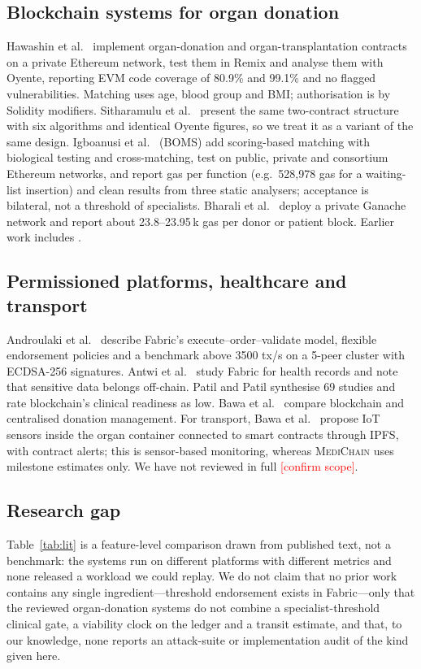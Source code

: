 \documentclass[journal]{IEEEtran}
\newcommand{\todo}[1]{\textcolor{red}{[#1]}}
\newcommand{\mc}{\textsc{MediChain}}
\begin{document}
\subsection{Blockchain systems for organ donation}
Hawashin et al.\ \cite{hawashin2022} implement organ-donation and
organ-transplantation contracts on a private Ethereum network, test them in
Remix and analyse them with Oyente, reporting EVM code coverage of 80.9\% and
99.1\% and no flagged vulnerabilities. Matching uses age, blood group and
BMI; authorisation is by Solidity modifiers. Sitharamulu et
al.\ \cite{sitharamulu2024} present the same two-contract structure with six
algorithms and identical Oyente figures, so we treat it as a variant of the
same design. Igboanusi et al.\ \cite{boms2024} (BOMS) add scoring-based
matching with biological testing and cross-matching, test on public, private
and consortium Ethereum networks, and report gas per function (e.g.\ 528{,}978
gas for a waiting-list insertion) and clean results from three static
analysers; acceptance is bilateral, not a threshold of specialists. Bharali
et al.\ \cite{bharali2026} deploy a private Ganache network and report about
23.8--23.95\,k gas per donor or patient block. Earlier work includes
\cite{zouarhi2017,dajim2019,alandjani2019,daniel2020}.

\subsection{Permissioned platforms, healthcare and transport}
Androulaki et al.\ \cite{fabric2018} describe Fabric's
execute--order--validate model, flexible endorsement policies and a
benchmark above 3500 tx/s on a 5-peer cluster with ECDSA-256 signatures.
Antwi et al.\ \cite{antwi2021} study Fabric for health records and note that
sensitive data belongs off-chain. Patil and Patil \cite{patil2026} synthesise
69 studies and rate blockchain's clinical readiness as low. Bawa et
al.\ \cite{bawa2024} compare blockchain and centralised donation management.
For transport, Bawa et al.\ \cite{iot2025} propose IoT sensors inside the
organ container connected to smart contracts through IPFS, with contract
alerts; this is sensor-based monitoring, whereas \mc{} uses milestone
estimates only. We have not reviewed \cite{transport2025} in full
\todo{confirm scope}.

\subsection{Research gap}
Table~\ref{tab:lit} is a feature-level comparison drawn from published text,
not a benchmark: the systems run on different platforms with different
metrics and none released a workload we could replay. We do not claim that
no prior work contains any single ingredient---threshold endorsement exists
in Fabric---only that the reviewed organ-donation systems do not combine a
specialist-threshold clinical gate, a viability clock on the ledger and a
transit estimate, and that, to our knowledge, none reports an attack-suite
or implementation audit of the kind given here.
\end{document}
